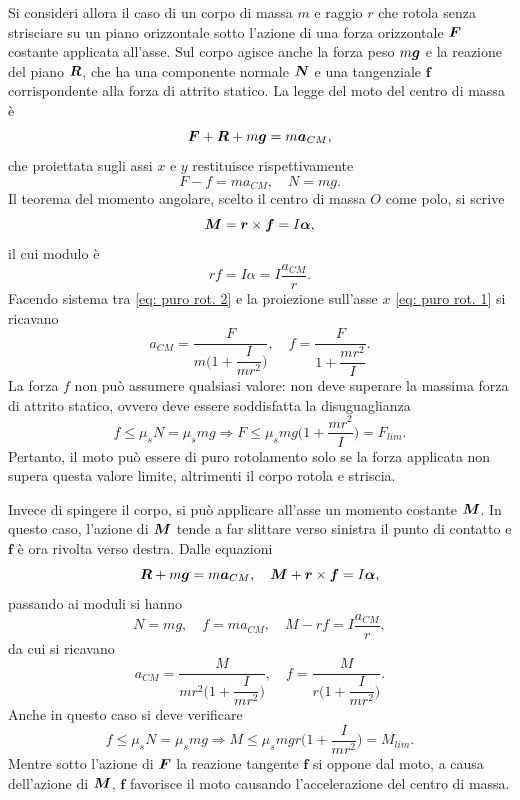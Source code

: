 Si consideri allora il caso di un corpo di massa $m$ e raggio $r$ che rotola senza strisciare su un piano orizzontale sotto l'azione di una forza orizzontale $\bm{F}$ costante applicata all'asse. Sul corpo agisce anche la forza peso $m\bm{g}$ e la reazione del piano $\bm{R}$, che ha una componente normale $\bm{N}$ e una tangenziale $\bm{f}$ corrispondente alla forza di attrito statico. La legge del moto del centro di massa è
\begin{equation}
    \bm{F}+\bm{R}+m\bm{g}=m\bm{a}_{CM},
\end{equation}
che proiettata sugli assi $x$ e $y$ restituisce rispettivamente
\begin{equation}
\label{eq: puro rot. 1}
    F-f=ma_{CM},\quad N=mg.
\end{equation}
Il teorema del momento angolare, scelto il centro di massa $O$ come polo, si scrive
\begin{equation}
    \bm{M}=\bm{r}\times\bm{f}=I\bm{\alpha},
\end{equation}
il cui modulo è
\begin{equation}
\label{eq: puro rot. 2}
     rf=I\alpha=I\frac{a_{CM}}{r}.
\end{equation}
Facendo sistema tra \eqref{eq: puro rot. 2} e la proiezione sull'asse $x$ \eqref{eq: puro rot. 1} si ricavano
\begin{equation}
    a_{CM}=\frac{F}{m\bigg(1+\dfrac{I}{mr^2}\bigg)},\quad f=\frac{F}{1+\dfrac{mr^2}{I}}.
\end{equation}
La forza $f$ non può assumere qualsiasi valore: non deve superare la massima forza di attrito statico, ovvero deve essere soddisfatta la disuguaglianza
\begin{equation}
    f\le\mu_sN=\mu_smg\Rightarrow F\le\mu_smg\bigg(1+\dfrac{mr^2}{I}\bigg)=F_{lim}.
\end{equation}
Pertanto, il moto può essere di puro rotolamento solo se la forza applicata non supera questa valore limite, altrimenti il corpo rotola e striscia. 

Invece di spingere il corpo, si può applicare all'asse un momento costante $\bm{M}$. In questo caso, l'azione di $\bm{M}$ tende a far slittare verso sinistra il punto di contatto e $\bm{f}$ è ora rivolta verso destra. Dalle equazioni
\begin{equation}
    \bm{R}+m\bm{g}=m\bm{a}_{CM},\quad\bm{M}+\bm{r}\times\bm{f}=I\bm{\alpha},
\end{equation}
passando ai moduli si hanno
\begin{equation}
    N=mg,\quad f=ma_{CM},\quad M-rf=I\frac{a_{CM}}{r},
\end{equation}
da cui si ricavano
\begin{equation}
    a_{CM}=\frac{M}{mr^2\bigg(1+\dfrac{I}{mr^2}\bigg)},\quad f=\frac{M}{r\bigg(1+\dfrac{I}{mr^2}\bigg)}.
\end{equation}
Anche in questo caso si deve verificare
\begin{equation}
    f\le\mu_sN=\mu_smg\Rightarrow M\le\mu_smgr\bigg(1+\frac{I}{mr^2}\bigg)=M_{lim}.
\end{equation}
Mentre sotto l'azione di $\bm{F}$ la reazione tangente $\bm{f}$ si oppone dal moto, a causa dell'azione di $\bm{M}$, $\bm{f}$ favorisce il moto causando l'accelerazione del centro di massa. 

